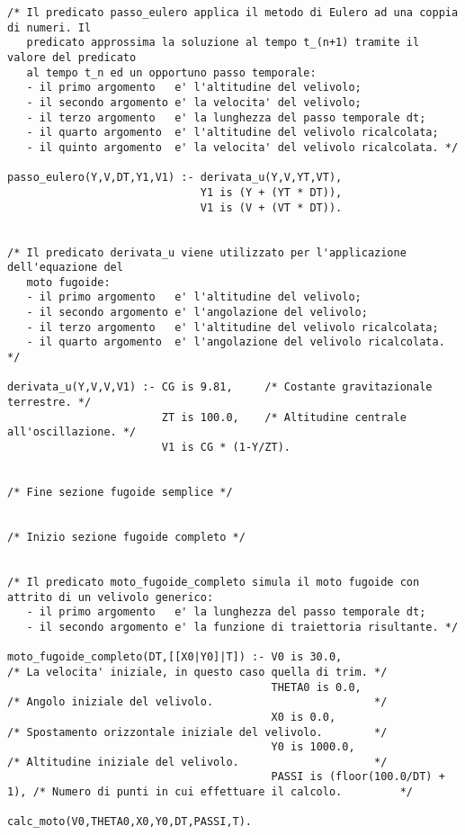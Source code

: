 \begin{verbatim}
/* Il predicato passo_eulero applica il metodo di Eulero ad una coppia di numeri. Il
   predicato approssima la soluzione al tempo t_(n+1) tramite il valore del predicato 
   al tempo t_n ed un opportuno passo temporale: 
   - il primo argomento   e' l'altitudine del velivolo;
   - il secondo argomento e' la velocita' del velivolo;
   - il terzo argomento   e' la lunghezza del passo temporale dt;
   - il quarto argomento  e' l'altitudine del velivolo ricalcolata;
   - il quinto argomento  e' la velocita' del velivolo ricalcolata. */

passo_eulero(Y,V,DT,Y1,V1) :- derivata_u(Y,V,YT,VT),
                              Y1 is (Y + (YT * DT)),
                              V1 is (V + (VT * DT)).


/* Il predicato derivata_u viene utilizzato per l'applicazione dell'equazione del 
   moto fugoide:
   - il primo argomento   e' l'altitudine del velivolo;
   - il secondo argomento e' l'angolazione del velivolo;
   - il terzo argomento   e' l'altitudine del velivolo ricalcolata;
   - il quarto argomento  e' l'angolazione del velivolo ricalcolata. */

derivata_u(Y,V,V,V1) :- CG is 9.81,     /* Costante gravitazionale terrestre. */
                        ZT is 100.0,    /* Altitudine centrale all'oscillazione. */
                        V1 is CG * (1-Y/ZT).


/* Fine sezione fugoide semplice */


/* Inizio sezione fugoide completo */


/* Il predicato moto_fugoide_completo simula il moto fugoide con attrito di un velivolo generico:
   - il primo argomento   e' la lunghezza del passo temporale dt;
   - il secondo argomento e' la funzione di traiettoria risultante. */

moto_fugoide_completo(DT,[[X0|Y0]|T]) :- V0 is 30.0,                     /* La velocita' iniziale, in questo caso quella di trim. */
                                         THETA0 is 0.0,                  /* Angolo iniziale del velivolo.                         */
                                         X0 is 0.0,                      /* Spostamento orizzontale iniziale del velivolo.        */
                                         Y0 is 1000.0,                   /* Altitudine iniziale del velivolo.                     */
                                         PASSI is (floor(100.0/DT) + 1), /* Numero di punti in cui effettuare il calcolo.         */
                                         calc_moto(V0,THETA0,X0,Y0,DT,PASSI,T).



\end{verbatim}
